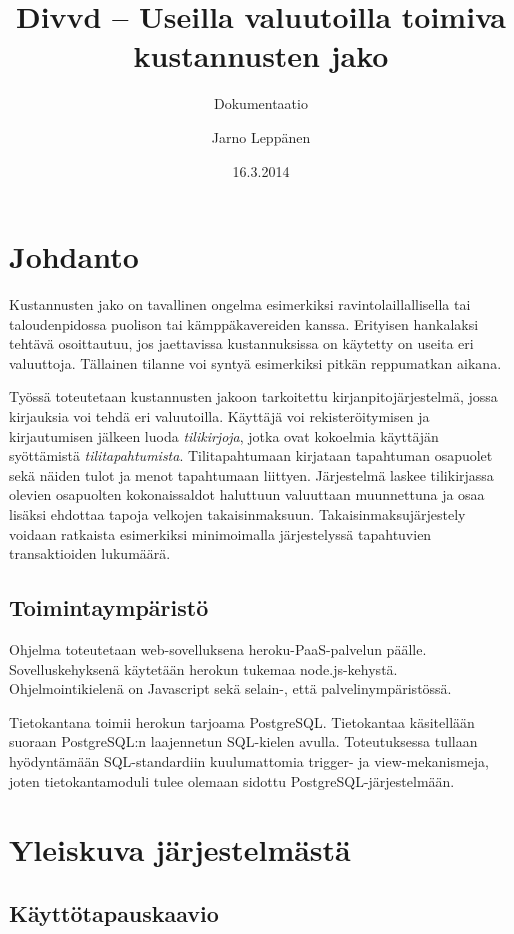 \documentclass[a4paper]{scrartcl}
\author{Jarno Leppänen}
\title{Divvd -- Useilla valuutoilla toimiva kustannusten jako}
\subtitle{Dokumentaatio}
\date{16.3.2014}
\begin{document}
\maketitle

\section{Johdanto}

Kustannusten jako on tavallinen ongelma esimerkiksi ravintolaillallisella tai
taloudenpidossa puolison tai kämppäkavereiden kanssa. Erityisen hankalaksi
tehtävä osoittautuu, jos jaettavissa kustannuksissa on käytetty on useita eri
valuuttoja. Tällainen tilanne voi syntyä esimerkiksi pitkän reppumatkan aikana.

Työssä toteutetaan kustannusten jakoon tarkoitettu kirjanpitojärjestelmä, jossa
kirjauksia voi tehdä eri valuutoilla. Käyttäjä voi rekisteröitymisen ja
kirjautumisen jälkeen luoda \textit{tilikirjoja}, jotka ovat kokoelmia
käyttäjän syöttämistä \textit{tilitapahtumista}. Tilitapahtumaan kirjataan
tapahtuman osapuolet sekä näiden tulot ja menot tapahtumaan liittyen.
Järjestelmä laskee tilikirjassa olevien osapuolten kokonaissaldot haluttuun
valuuttaan muunnettuna ja osaa lisäksi ehdottaa tapoja velkojen
takaisinmaksuun. Takaisinmaksujärjestely voidaan ratkaista esimerkiksi
minimoimalla järjestelyssä tapahtuvien transaktioiden
lukumäärä\cite{verhoeff2004settling}.

\subsection{Toimintaympäristö}

Ohjelma toteutetaan web-sovelluksena heroku-PaaS-palvelun päälle.
Sovelluskehyksenä käytetään herokun tukemaa node.js-kehystä. Ohjelmointikielenä
on Javascript sekä selain-, että palvelinympäristössä.

Tietokantana toimii herokun tarjoama PostgreSQL. Tietokantaa käsitellään
suoraan Postgre\-SQL:n laajennetun SQL-kielen avulla. Toteutuksessa tullaan
hyödyntämään SQL-standardiin kuulumattomia trigger- ja view-mekanismeja, joten
tietokantamoduli tulee olemaan sidottu Post\-gre\-SQL-jär\-jes\-tel\-mään.

\section{Yleiskuva järjestelmästä}

\subsection{Käyttötapauskaavio}
\end{document}
